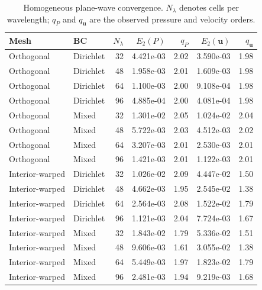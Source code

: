 \begin{table}[htbp]
\centering
\small
\setlength{\tabcolsep}{4pt}
\begin{tabular}{llrrrrr}
\toprule
Mesh & BC & $N_\lambda$ & $E_2(P)$ & $q_P$ & $E_2(\mathbf{u})$ & $q_{\mathbf{u}}$ \\
\midrule
Orthogonal & Dirichlet & 32 & 4.421e-03 & 2.02 & 3.590e-03 & 1.98 \\
Orthogonal & Dirichlet & 48 & 1.958e-03 & 2.01 & 1.609e-03 & 1.98 \\
Orthogonal & Dirichlet & 64 & 1.100e-03 & 2.00 & 9.108e-04 & 1.98 \\
Orthogonal & Dirichlet & 96 & 4.885e-04 & 2.00 & 4.081e-04 & 1.98 \\
Orthogonal & Mixed & 32 & 1.301e-02 & 2.05 & 1.024e-02 & 2.04 \\
Orthogonal & Mixed & 48 & 5.722e-03 & 2.03 & 4.512e-03 & 2.02 \\
Orthogonal & Mixed & 64 & 3.207e-03 & 2.01 & 2.530e-03 & 2.01 \\
Orthogonal & Mixed & 96 & 1.421e-03 & 2.01 & 1.122e-03 & 2.01 \\
Interior-warped & Dirichlet & 32 & 1.026e-02 & 2.09 & 4.447e-02 & 1.50 \\
Interior-warped & Dirichlet & 48 & 4.662e-03 & 1.95 & 2.545e-02 & 1.38 \\
Interior-warped & Dirichlet & 64 & 2.564e-03 & 2.08 & 1.522e-02 & 1.79 \\
Interior-warped & Dirichlet & 96 & 1.121e-03 & 2.04 & 7.724e-03 & 1.67 \\
Interior-warped & Mixed & 32 & 1.843e-02 & 1.79 & 5.336e-02 & 1.51 \\
Interior-warped & Mixed & 48 & 9.606e-03 & 1.61 & 3.055e-02 & 1.38 \\
Interior-warped & Mixed & 64 & 5.449e-03 & 1.97 & 1.823e-02 & 1.79 \\
Interior-warped & Mixed & 96 & 2.481e-03 & 1.94 & 9.219e-03 & 1.68 \\
\bottomrule
\end{tabular}
\caption{Homogeneous plane-wave convergence. $N_\lambda$ denotes cells per wavelength; $q_P$ and $q_{\mathbf{u}}$ are the observed pressure and velocity orders.}
\label{tab:homogeneousConvergence}
\end{table}
